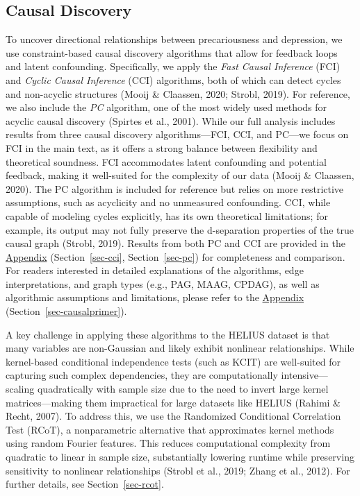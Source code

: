\documentclass[
]{article}
\begin{document}
\subsection{Causal Discovery}\label{sec-analysis}

To uncover directional relationships between precariousness and
depression, we use constraint-based causal discovery algorithms that
allow for feedback loops and latent confounding. Specifically, we apply
the \emph{Fast Causal Inference} (FCI) and \emph{Cyclic Causal
Inference} (CCI) algorithms, both of which can detect cycles and
non-acyclic structures (Mooij \& Claassen, 2020; Strobl, 2019). For
reference, we also include the \emph{PC} algorithm, one of the most
widely used methods for acyclic causal discovery (Spirtes et al., 2001).
While our full analysis includes results from three causal discovery
algorithms---FCI, CCI, and PC---we focus on FCI in the main text, as it
offers a strong balance between flexibility and theoretical soundness.
FCI accommodates latent confounding and potential feedback, making it
well-suited for the complexity of our data (Mooij \& Claassen, 2020).
The PC algorithm is included for reference but relies on more
restrictive assumptions, such as acyclicity and no unmeasured
confounding. CCI, while capable of modeling cycles explicitly, has its
own theoretical limitations; for example, its output may not fully
preserve the d-separation properties of the true causal graph (Strobl,
2019). Results from both PC and CCI are provided in the
\hyperref[sec-appendix]{Appendix}
(Section~\ref{sec-cci}, Section~\ref{sec-pc}) for completeness and
comparison. For readers interested in detailed explanations of the
algorithms, edge interpretations, and graph types (e.g., PAG, MAAG,
CPDAG), as well as algorithmic assumptions and limitations, please refer
to the \hyperref[sec-appendix]{Appendix}
(Section~\ref{sec-causalprimer}).

A key challenge in applying these algorithms to the HELIUS dataset is
that many variables are non-Gaussian and likely exhibit nonlinear
relationships. While kernel-based conditional independence tests (such
as KCIT) are well-suited for capturing such complex dependencies, they
are computationally intensive---scaling quadratically with sample size
due to the need to invert large kernel matrices---making them
impractical for large datasets like HELIUS (Rahimi \& Recht, 2007). To
address this, we use the Randomized Conditional Correlation Test (RCoT),
a nonparametric alternative that approximates kernel methods using
random Fourier features. This reduces computational complexity from
quadratic to linear in sample size, substantially lowering runtime while
preserving sensitivity to nonlinear relationships (Strobl et al., 2019;
Zhang et al., 2012). For further details, see Section~\ref{sec-rcot}.
\end{document}
